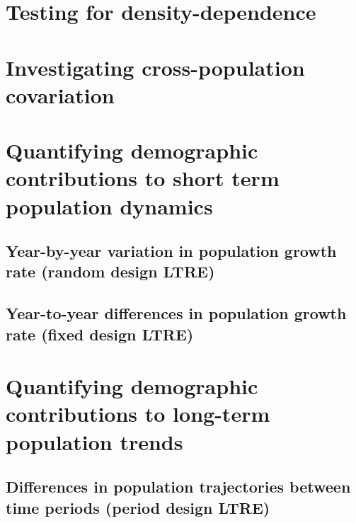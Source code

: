 \documentclass[
]{book}
\begin{document}
\hypertarget{testing-for-density-dependence}{%
\section{Testing for density-dependence}\label{testing-for-density-dependence}}

\hypertarget{investigating-cross-population-covariation}{%
\section{Investigating cross-population covariation}\label{investigating-cross-population-covariation}}

\hypertarget{quantifying-demographic-contributions-to-short-term-population-dynamics}{%
\section{Quantifying demographic contributions to short term population dynamics}\label{quantifying-demographic-contributions-to-short-term-population-dynamics}}

\hypertarget{year-by-year-variation-in-population-growth-rate-random-design-ltre}{%
\subsection{Year-by-year variation in population growth rate (random design LTRE)}\label{year-by-year-variation-in-population-growth-rate-random-design-ltre}}

\hypertarget{year-to-year-differences-in-population-growth-rate-fixed-design-ltre}{%
\subsection{Year-to-year differences in population growth rate (fixed design LTRE)}\label{year-to-year-differences-in-population-growth-rate-fixed-design-ltre}}

\hypertarget{quantifying-demographic-contributions-to-long-term-population-trends}{%
\section{Quantifying demographic contributions to long-term population trends}\label{quantifying-demographic-contributions-to-long-term-population-trends}}

\hypertarget{differences-in-population-trajectories-between-time-periods-period-design-ltre}{%
\subsection{Differences in population trajectories between time periods (period design LTRE)}\label{differences-in-population-trajectories-between-time-periods-period-design-ltre}}
\end{document}

